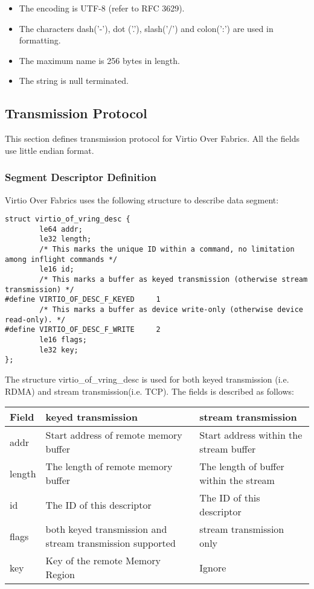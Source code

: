 \begin{itemize}
\item The encoding is UTF-8 (refer to RFC 3629).
\item The characters dash('-'), dot ('.'), slash('/') and colon(':') are used
in formatting.
\item The maximum name is 256 bytes in length.
\item The string is null terminated.
\end{itemize}

\subsection{Transmission Protocol}\label{sec:Virtio Transport Options / Virtio Over Fabrics / Transmission Protocol}
This section defines transmission protocol for Virtio Over Fabrics. All the
fields use little endian format.

\subsubsection{Segment Descriptor Definition}\label{sec:Virtio Transport Options / Virtio Over Fabrics / Transmission Protocol / Segment Descriptor Definition}
Virtio Over Fabrics uses the following structure to describe data segment:

\begin{lstlisting}
struct virtio_of_vring_desc {
        le64 addr;
        le32 length;
        /* This marks the unique ID within a command, no limitation among inflight commands */
        le16 id;
        /* This marks a buffer as keyed transmission (otherwise stream transmission) */
#define VIRTIO_OF_DESC_F_KEYED     1
        /* This marks a buffer as device write-only (otherwise device read-only). */
#define VIRTIO_OF_DESC_F_WRITE     2
        le16 flags;
        le32 key;
};
\end{lstlisting}

The structure virtio_of_vring_desc is used for both keyed transmission
(i.e. RDMA) and stream transmission(i.e. TCP). The fields is described as follows:

\begin{tabular}{ |l|l|l| }
\hline
Field & keyed transmission & stream transmission \\
\hline \hline
addr & Start address of remote memory buffer & Start address within the stream buffer \\
\hline
length & The length of remote memory buffer & The length of buffer within the stream \\
\hline
id & The ID of this descriptor & The ID of this descriptor \\
\hline
flags & both keyed transmission and stream transmission supported & stream transmission only \\
\hline
key & Key of the remote Memory Region & Ignore \\
\hline
\end{tabular}

